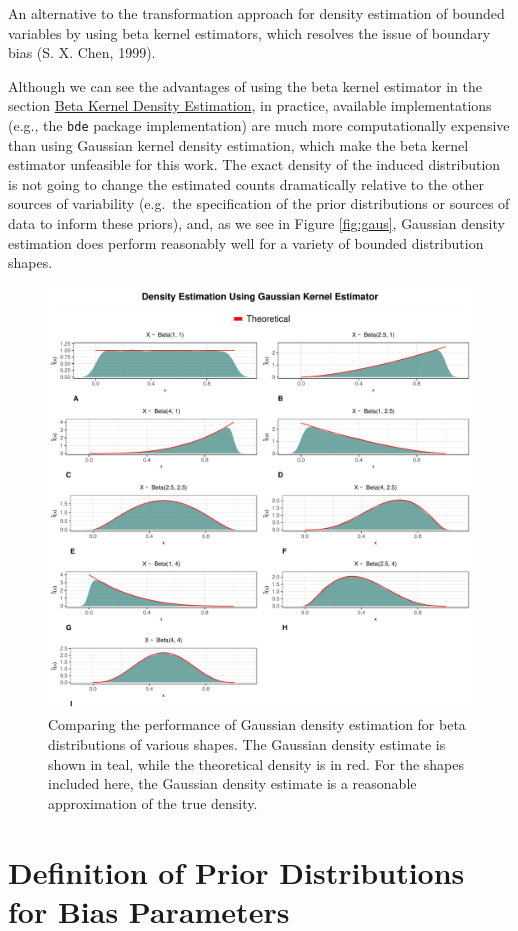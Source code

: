 \documentclass[12pt,twoside]{smiththesis}
\begin{document}
An alternative to the transformation approach for density estimation of bounded variables by using beta kernel estimators, which resolves the issue of boundary bias (S. X. Chen, 1999).

Although we can see the advantages of using the beta kernel estimator in the section \protect\hyperlink{betakernel}{Beta Kernel Density Estimation}, in practice, available implementations (e.g., the \texttt{bde} package implementation) are much more computationally expensive than using Gaussian kernel density estimation, which make the beta kernel estimator unfeasible for this work. The exact density of the induced distribution is not going to change the estimated counts dramatically relative to the other sources of variability (e.g.~the specification of the prior distributions or sources of data to inform these priors), and, as we see in Figure \ref{fig:gaus}, Gaussian density estimation does perform reasonably well for a variety of bounded distribution shapes.
\begin{figure}

{\centering \includegraphics[width=1\linewidth]{figure/compare-gaussian} 

}

\caption{\label{fig:gaus}Comparing the performance of Gaussian density estimation for beta distributions of various shapes. The Gaussian density estimate is shown in teal, while the theoretical density is in red. For the shapes included here, the Gaussian density estimate is a reasonable approximation of the true density.}\label{fig:unnamed-chunk-34}
\end{figure}
\hypertarget{defpriors}{%
\chapter{Definition of Prior Distributions for Bias Parameters}\label{defpriors}}
\end{document}
